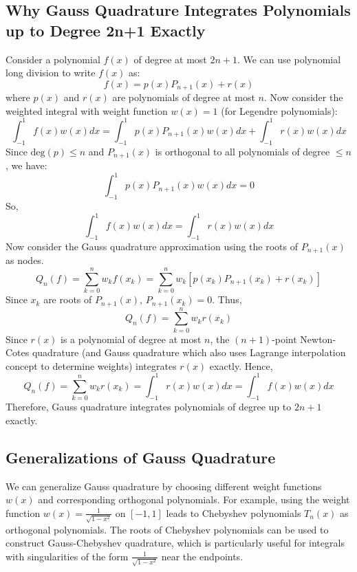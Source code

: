 \documentclass{article}
\begin{document}
\subsection{Why Gauss Quadrature Integrates Polynomials up to Degree 2n+1 Exactly}
Consider a polynomial $f(x)$ of degree at most $2n+1$. We can use polynomial long division to write $f(x)$ as:
\[
f(x) = p(x) P_{n+1}(x) + r(x)
\]
where $p(x)$ and $r(x)$ are polynomials of degree at most $n$.
Now consider the weighted integral with weight function $w(x) = 1$ (for Legendre polynomials):
\[
\int_{-1}^1 f(x) w(x) dx = \int_{-1}^1 p(x) P_{n+1}(x) w(x) dx + \int_{-1}^1 r(x) w(x) dx
\]
Since $\text{deg}(p) \leq n$ and $P_{n+1}(x)$ is orthogonal to all polynomials of degree $\leq n$, we have:
\[
\int_{-1}^1 p(x) P_{n+1}(x) w(x) dx = 0
\]
So,
\[
\int_{-1}^1 f(x) w(x) dx = \int_{-1}^1 r(x) w(x) dx
\]
Now consider the Gauss quadrature approximation using the roots of $P_{n+1}(x)$ as nodes.
\[
Q_n(f) = \sum_{k=0}^n w_k f(x_k) = \sum_{k=0}^n w_k [p(x_k) P_{n+1}(x_k) + r(x_k)]
\]
Since $x_k$ are roots of $P_{n+1}(x)$, $P_{n+1}(x_k) = 0$. Thus,
\[
Q_n(f) = \sum_{k=0}^n w_k r(x_k)
\]
Since $r(x)$ is a polynomial of degree at most $n$, the $(n+1)$-point Newton-Cotes quadrature (and Gauss quadrature which also uses Lagrange interpolation concept to determine weights) integrates $r(x)$ exactly. Hence,
\[
Q_n(f) = \sum_{k=0}^n w_k r(x_k) = \int_{-1}^1 r(x) w(x) dx = \int_{-1}^1 f(x) w(x) dx
\]
Therefore, Gauss quadrature integrates polynomials of degree up to $2n+1$ exactly.

\subsection{Generalizations of Gauss Quadrature}
We can generalize Gauss quadrature by choosing different weight functions $w(x)$ and corresponding orthogonal polynomials. For example, using the weight function $w(x) = \frac{1}{\sqrt{1-x^2}}$ on $[-1, 1]$ leads to Chebyshev polynomials $T_n(x)$ as orthogonal polynomials. The roots of Chebyshev polynomials can be used to construct Gauss-Chebyshev quadrature, which is particularly useful for integrals with singularities of the form $\frac{1}{\sqrt{1-x^2}}$ near the endpoints.
\end{document}
